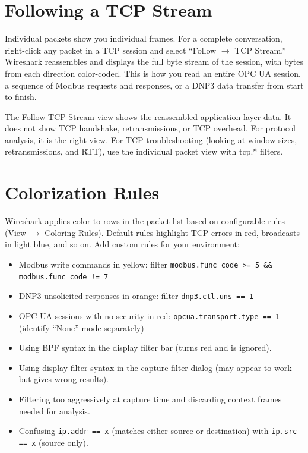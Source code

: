 \documentclass[12pt,twoside,openright]{memoir}
\newcommand{\filter}[1]{\texttt{\color{wsblue}#1}}
\begin{document}
\section{Following a TCP Stream}

Individual packets show you individual frames. For a complete conversation, right-click any packet in a TCP session and select ``Follow $\to$ TCP Stream.'' Wireshark reassembles and displays the full byte stream of the session, with bytes from each direction color-coded. This is how you read an entire OPC UA session, a sequence of Modbus requests and responses, or a DNP3 data transfer from start to finish.

\begin{keyconcept}[title={Follow TCP Stream vs.\ Individual Packets}]
The Follow TCP Stream view shows the reassembled application-layer data. It does not show TCP handshake, retransmissions, or TCP overhead. For protocol analysis, it is the right view. For TCP troubleshooting (looking at window sizes, retransmissions, and RTT), use the individual packet view with tcp.* filters.
\end{keyconcept}

\section{Colorization Rules}

Wireshark applies color to rows in the packet list based on configurable rules (View $\to$ Coloring Rules). Default rules highlight TCP errors in red, broadcasts in light blue, and so on. Add custom rules for your environment:

\begin{itemize}[noitemsep]
  \item Modbus write commands in yellow: filter \filter{modbus.func\_code >= 5 \&\& modbus.func\_code != 7}
  \item DNP3 unsolicited responses in orange: filter \filter{dnp3.ctl.uns == 1}
  \item OPC UA sessions with no security in red: \filter{opcua.transport.type == 1} (identify ``None'' mode separately)
\end{itemize}

\begin{commonmistakes}
\begin{itemize}[noitemsep]
  \item Using BPF syntax in the display filter bar (turns red and is ignored).
  \item Using display filter syntax in the capture filter dialog (may appear to work but gives wrong results).
  \item Filtering too aggressively at capture time and discarding context frames needed for analysis.
  \item Confusing \filter{ip.addr == x} (matches either source or destination) with \filter{ip.src == x} (source only).
\end{itemize}
\end{commonmistakes}
\end{document}
